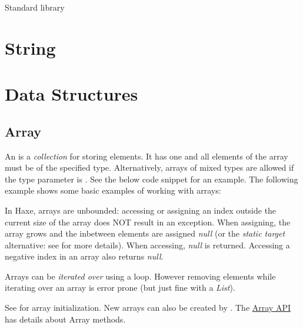 \documentclass{haxe}
\begin{document}
Standard library

\section{String}
\label{std-String}



\section{Data Structures}
\label{std-ds}

\subsection{Array}
\label{std-Array}

An  is a \emph{collection} for storing elements.  It has one  and all elements of the array must be of the specified type.  Alternatively, arrays of mixed types are allowed if the type parameter is .  See the below code snippet for an example. 
The following example shows some basic examples of working with arrays:

In Haxe, arrays are unbounded:  accessing or assigning an index outside the current size of the array does NOT result in an exception.  When assigning, the array grows and the inbetween elements are assigned \emph{null} (or the \emph{static target} alternative: see  for more details).  When accessing, \emph{null} is returned.  Accessing a negative index in an array also returns \emph{null}.

Arrays can be \emph{iterated over} using a  loop.  However removing elements while iterating over an array is error prone (but just fine with a \emph{List}).

See  for array initialization.  New arrays can also be created by .  The \href{http://api.haxe.org/Array.html}{Array API} has details about Array methods.
\end{document}
